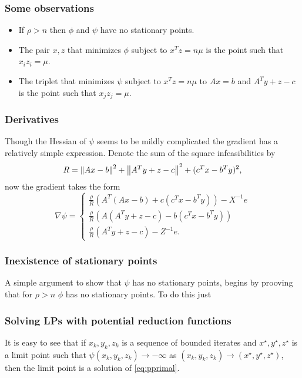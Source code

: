 \documentclass{article}
\begin{document}
\subsubsection{Some observations}
\begin{itemize}
  \item If $\rho > n$ then $\phi$ and $\psi$ have no stationary points.
  \item The pair $x,z$ that minimizes $\phi$ subject to $x^Tz = n \mu$ is the point such that $x_iz_i = \mu$.
  \item The triplet that minimizes $\psi$ subject to $x^Tz = n\mu$ to $Ax=b$ and $A^Ty + z - c$ is the point such that $x_jz_j = \mu$. 
\end{itemize}

\subsubsection{Derivatives}
Though the Hessian of $\psi$ seems to be mildly complicated the gradient has a
relatively simple expression. 
Denote the sum of the square infeasibilities by 
\[R = \left\| Ax-b \right\|^2+\left\| A^Ty+z-c \right\|^2 + (c^Tx-b^Ty)^2,\]
now the gradient takes the form 
\[
\nabla \psi = \begin{cases}
              \frac{\rho}{R} \left(A^T(Ax-b) + c(c^Tx-b^Ty)\right) - X^{-1}e\\
              \frac{\rho}{R} \left(A(A^Ty+z-c)-b(c^Tx-b^Ty)\right)\\
              \frac{\rho}{R} \left(A^Ty+z-c\right)                              - Z^{-1}e.
              \end{cases}
\]

\subsubsection{Inexistence of stationary points}
A simple argument to show that $\psi$ has no stationary points, begins 
by prooving that for $\rho>n$ $\phi$ has no stationary points.
To do this just 

\subsubsection{Solving LPs with potential reduction functions}
    It is easy to see that if $x_k,y_k,z_k$ is a sequence of bounded iterates and
    $x^\star,y^\star,z^\star$ is a limit point such that $\psi(x_k,y_k,z_k) \rightarrow - \infty$
    as $(x_k,y_k,z_k) \rightarrow (x^\star,y^\star,z^\star)$, then the limit point is a solution
    of \eqref{eq:pprimal}.
\end{document}
